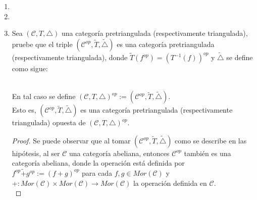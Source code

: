 \documentclass{article}
\begin{document}
\begin{enumerate}
\begin{proof}
\centerline{
}

Así, por ( TR3 ) existe $s:Z\to M$ tal que $1_M\circ t=sv$ y por lo tanto $v\in SCoKer(u)$.\\

Por último, rotando el triángulo de las hipótesis por ( TR1c ) se tiene que  está en $\triangle$, 
así por lo demostrado $v\in Ker(w)$ y $w\in CoKer(v)$.

\end{proof}

\item
\item
\item Sea $(\mathscr{C},T,\triangle)$ una categoría pretriangulada (respectivamente triangulada), pruebe que el triple 
$(\mathscr{C}^{op},\tilde{T},\tilde{\triangle})$ es una categoría pretriangulada (respectivamente triangulada), donde 
$\tilde{T}(f^{op})=(T^{-1}(f))^{op}$ y $\tilde{\triangle}$ se define como sigue:\\
\centerline{
}\\

En tal caso se define $(\mathscr{C},T,\triangle)^{op}:=(\mathscr{C}^{op},\tilde{T},\tilde{\triangle}).$\\
Esto es, $(\mathscr{C}^{op},\tilde{T},\tilde{\triangle})$ es una categoría pretriangulada (respectivamente triangulada) opuesta de
 $(\mathscr{C},T,\triangle)^{op}$.

\begin{proof}

Se puede observar que al tomar  $(\mathscr{C}^{op},\tilde{T},\tilde{\triangle})$ como se describe en las hipótesis, al ser $\mathscr{C}$ 
una categoría abeliana, entonces $\mathscr{C}^{op}$ también es una categoría abeliana, donde la operación está definida por \\
$f^{op}\tilde{+}g^{op}:=(f+g)^{op}$ para cada $f,g\in Mor(\mathscr{C})$ y\\
 $+: Mor(\mathscr{C})\times Mor(\mathscr{C})\rightarrow Mor(\mathscr{C})$ la operación definida en $ \mathscr{C}$.\\


\end{proof}
\end{enumerate}
\end{document}
